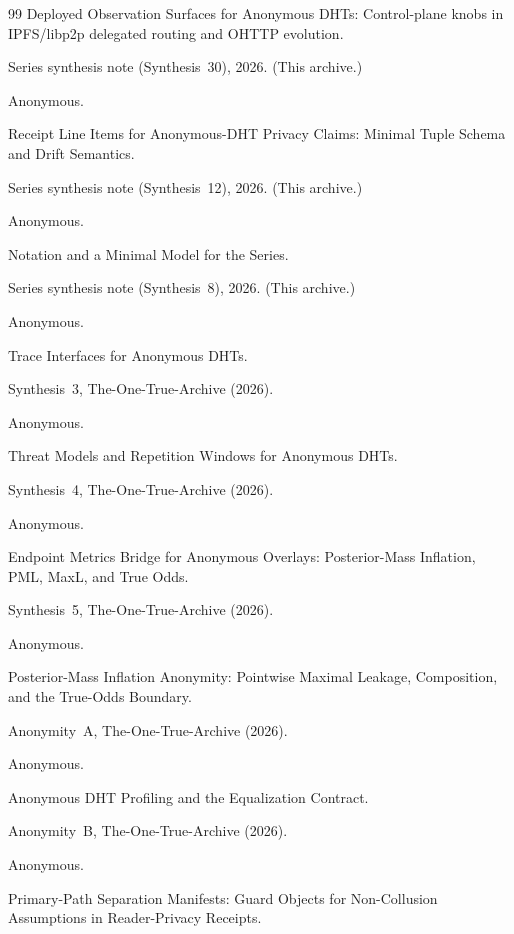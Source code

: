 \documentclass[11pt]{article}
\begin{document}
\begin{thebibliography}{99}
\newblock Deployed Observation Surfaces for Anonymous DHTs: Control-plane knobs in IPFS/libp2p delegated routing and OHTTP evolution.

\newblock Series synthesis note (Synthesis~30), 2026. (This archive.)

Anonymous.

\newblock Receipt Line Items for Anonymous-DHT Privacy Claims: Minimal Tuple Schema and Drift Semantics.

\newblock Series synthesis note (Synthesis~12), 2026. (This archive.)

Anonymous.

\newblock Notation and a Minimal Model for the Series.

\newblock Series synthesis note (Synthesis~8), 2026. (This archive.)

Anonymous.

\newblock Trace Interfaces for Anonymous DHTs.

\newblock Synthesis~3, The-One-True-Archive (2026).

Anonymous.

\newblock Threat Models and Repetition Windows for Anonymous DHTs.

\newblock Synthesis~4, The-One-True-Archive (2026).

Anonymous.

\newblock Endpoint Metrics Bridge for Anonymous Overlays: Posterior-Mass Inflation, PML, MaxL, and True Odds.

\newblock Synthesis~5, The-One-True-Archive (2026).

Anonymous.

\newblock Posterior-Mass Inflation Anonymity: Pointwise Maximal Leakage, Composition, and the True-Odds Boundary.

\newblock Anonymity~A, The-One-True-Archive (2026).

Anonymous.

\newblock Anonymous DHT Profiling and the Equalization Contract.

\newblock Anonymity~B, The-One-True-Archive (2026).

Anonymous.

\newblock Primary-Path Separation Manifests: Guard Objects for Non-Collusion Assumptions in Reader-Privacy Receipts.


\end{thebibliography}
\end{document}

